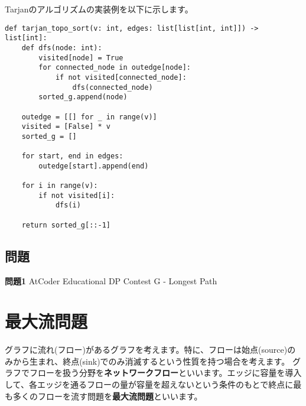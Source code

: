 \vspace{0.5cm}

\begin{center}
\end{center}
\vspace{0.5cm}

Tarjanのアルゴリズムの実装例を以下に示します。

\begin{lstlisting}[caption=Tarjanのアルゴリズムの実装, label=tarjan, frame=TRBL, label={tarjan}]
def tarjan_topo_sort(v: int, edges: list[list[int, int]]) -> list[int]:
    def dfs(node: int):
        visited[node] = True
        for connected_node in outedge[node]:
            if not visited[connected_node]:
                dfs(connected_node)
        sorted_g.append(node)
    
    outedge = [[] for _ in range(v)]
    visited = [False] * v
    sorted_g = []
    
    for start, end in edges:
        outedge[start].append(end)
    
    for i in range(v):
        if not visited[i]:
            dfs(i)
    
    return sorted_g[::-1]
\end{lstlisting}

\subsection{問題}

\textbf{問題1} AtCoder Educational DP Contest G - Longest Path\\

\newpage

\section{最大流問題}
グラフに流れ(フロー)があるグラフを考えます。特に、フローは始点(source)のみから生まれ、終点(sink)でのみ消滅するという性質を持つ場合を考えます。
グラフでフローを扱う分野を\textbf{ネットワークフロー}といいます。エッジに容量を導入して、各エッジを通るフローの量が容量を超えないという条件のもとで終点に最も多くのフローを流す問題を\textbf{最大流問題}といいます。

